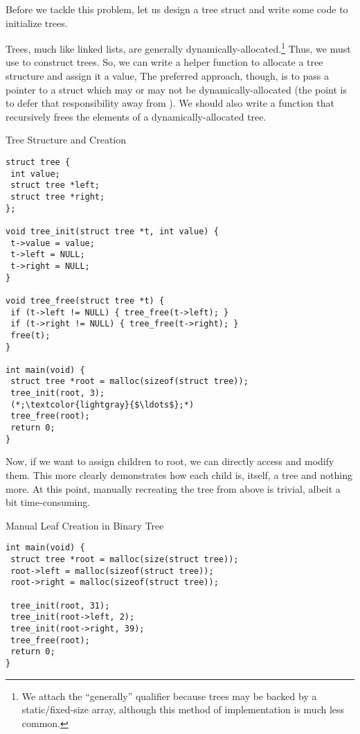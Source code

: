 Before we tackle this problem, let us design a tree struct and write some code to initialize trees.

Trees, much like linked lists, are generally dynamically-allocated.\footnote{We attach the ``generally'' qualifier because trees may be backed by a static/fixed-size array, although this method of implementation is much less common.} Thus, we must use  to construct trees. So, we can write a helper function to allocate a tree structure and assign it a value, The preferred approach, though, is to pass a pointer to a  struct which may or may not be dynamically-allocated (the point is to defer that responsibility away from ). We should also write a  function that recursively frees the elements of a dynamically-allocated tree.

\begin{cl}[main.c]{Tree Structure and Creation}\begin{lstlisting}[language=MyC]
struct tree {
 int value;
 struct tree *left;
 struct tree *right;
};

void tree_init(struct tree *t, int value) {
 t->value = value;
 t->left = NULL;
 t->right = NULL;
}

void tree_free(struct tree *t) {
 if (t->left != NULL) { tree_free(t->left); }
 if (t->right != NULL) { tree_free(t->right); }
 free(t);
}

int main(void) {
 struct tree *root = malloc(sizeof(struct tree));
 tree_init(root, 3);
 (*;\textcolor{lightgray}{$\ldots$};*)
 tree_free(root);
 return 0;
}
\end{lstlisting}\end{cl}

Now, if we want to assign children to root, we can directly access and modify them. This more clearly demonstrates how each child is, itself, a tree and nothing more. At this point, manually recreating the tree from above is trivial, albeit a bit time-consuming. 

\begin{cl}[main.c]{Manual Leaf Creation in Binary Tree}
\begin{lstlisting}[language=MyC]
int main(void) {
 struct tree *root = malloc(size(struct tree));
 root->left = malloc(sizeof(struct tree));
 root->right = malloc(sizeof(struct tree));
 
 tree_init(root, 31);
 tree_init(root->left, 2);
 tree_init(root->right, 39);
 tree_free(root);
 return 0;
}
\end{lstlisting}
\end{cl}

